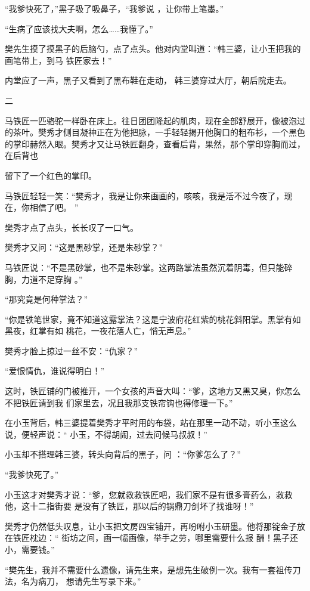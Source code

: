 \documentclass{article}
\begin{document}
“我爹快死了，”黑子吸了吸鼻子，“我爹说
，让你带上笔墨。” 

“生病了应该找大夫啊，怎么……我懂了。”

樊先生摸了摸黑子的后脑勺，点了点头。他对内堂叫道：“韩三婆，让小玉把我的画笔带上，到马
铁匠家去！” 

内堂应了一声，黑子又看到了黑布鞋在走动，
韩三婆穿过大厅，朝后院走去。 


二 

马铁匠一匹骆驼一样卧在床上。往日团团隆起的肌肉，现在全部舒展开，像被泡过的茶叶。樊秀才侧目凝神正在为他把脉，一手轻轻揭开他胸口的粗布衫，一个黑色的掌印赫然入眼。樊秀才又让马铁匠翻身，查看后背，果然，那个掌印穿胸而过，在后背也

\newpage
留下了一个红色的掌印。 

马铁匠轻轻一笑：“樊秀才，我是让你来画画的，咳咳，我是活不过今夜了，现在，你相信了吧。
” 


樊秀才点了点头，长长叹了一口气。 

樊秀才又问：“这是黑砂掌，还是朱砂掌？”

马铁匠说：“不是黑砂掌，也不是朱砂掌。这两路掌法虽然沉着阴毒，但只能碎胸，力道不足穿胸
。” 


“那究竟是何种掌法？” 

“你是铁笔世家，竟不知道这露掌法？这是宁波府花红紫的桃花斜阳掌。黑掌有如黑夜，红掌有如
桃花，一夜花落人亡，悄无声息。” 


樊秀才脸上掠过一丝不安：“仇家？” 

\newpage


“爱恨情仇，谁说得明白！” 

这时，铁匠铺的门被推开，一个女孩的声音大叫：“爹，这地方又黑又臭，你怎么不把铁匠请到我
们家里去，况且我那支铁帘钩也得修理一下。” 

在小玉背后，韩三婆提着樊秀才平时用的布袋，站在那里一动不动，听小玉这么说，便轻声说：“
小玉，不得胡闹，过去问候马叔叔！” 

小玉却不搭理韩三婆，转头向背后的黑子，问
：“你爹怎么了？” 


“我爹快死了。” 

小玉这才对樊秀才说：“爹，您就救救铁匠吧，我们家不是有很多膏药么，救救他，这十二指街要
是没有了铁匠，那以后的锅鼎刀剑坏了找谁呀！” 

樊秀才仍然低头叹息，让小玉把文房四宝铺开，再吩咐小玉研墨。他将那锭金子放在铁匠枕边：“
\newpage
街坊之间，画一幅画像，举手之劳，哪里需要什么报
酬！黑子还小，需要钱。” 

“樊先生，我并不需要什么遗像，请先生来，是想先生破例一次。我有一套祖传刀法，名为病刀，
想请先生写录下来。” 
\end{document}
